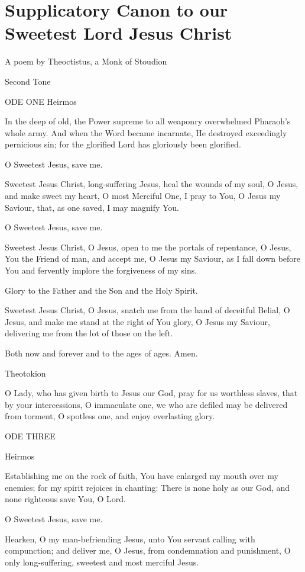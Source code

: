 \chapter{Supplicatory Canon to our Sweetest Lord Jesus Christ}

A poem by Theoctistus, a Monk of Stoudion

Second Tone

ODE ONE Heirmos

In the deep of old, the Power supreme to all weaponry overwhelmed
Pharaoh's whole army. And when the Word became incarnate, He destroyed
exceedingly pernicious sin; for the glorified Lord has gloriously been
glorified.

O Sweetest Jesus, save me.

Sweetest Jesus Christ, long-suffering Jesus, heal the wounds of my soul,
O Jesus, and make sweet my heart, O most Merciful One, I pray to You, O
Jesus my Saviour, that, as one saved, I may magnify You.

O Sweetest Jesus, save me.

Sweetest Jesus Christ, O Jesus, open to me the portals of repentance, O
Jesus, You the Friend of man, and accept me, O Jesus my Saviour, as I
fall down before You and fervently implore the forgiveness of my sins.

Glory to the Father and the Son and the Holy Spirit.

Sweetest Jesus Christ, O Jesus, snatch me from the hand of deceitful
Belial, O Jesus, and make me stand at the right of You glory, O Jesus my
Saviour, delivering me from the lot of those on the left.

Both now and forever and to the ages of ages. Amen.

Theotokion

O Lady, who has given birth to Jesus our God, pray for us worthless
slaves, that by your intercessions, O immaculate one, we who are defiled
may be delivered from torment, O spotless one, and enjoy everlasting
glory.

ODE THREE

Heirmos

Establishing me on the rock of faith, You have enlarged my mouth over my
enemies; for my spirit rejoices in chanting: There is none holy as our
God, and none righteous save You, O Lord.

O Sweetest Jesus, save me.

Hearken, O my man-befriending Jesus, unto You servant calling with
compunction; and deliver me, O Jesus, from condemnation and punishment,
O only long-suffering, sweetest and most merciful Jesus.


